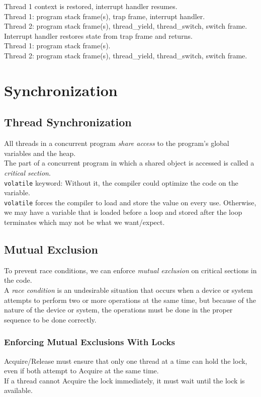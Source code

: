 \documentclass[12pt]{article}
\theoremstyle{plain}
\theoremstyle{definition}
\begin{document}
Thread 1 context is restored, interrupt handler resumes. \\
Thread 1: program stack frame(s), trap frame, interrupt handler. \\
Thread 2: program stack frame(s), thread\_yield, thread\_switch, switch frame. \\

Interrupt handler restores state from trap frame and returns. \\
Thread 1: program stack frame(s). \\
Thread 2: program stack frame(s), thread\_yield, thread\_switch, switch frame.


\section{Synchronization}
\subsection{Thread Synchronization}
All threads in a concurrent program \emph{share access} to the program's global variables and the heap. \\
The part of a concurrent program in which a shared object is accessed is called a \emph{critical section}. \\

\texttt{volatile} keyword:
Without it, the compiler could optimize the code on the variable. \\
\texttt{volatile} forces the compiler to load and store the value on every use.
Otherwise, we may have a variable that is loaded before a loop and stored after the loop terminates which may not be what we want/expect.

\subsection{Mutual Exclusion}
To prevent race conditions, we can enforce \emph{mutual exclusion} on critical sections in the code. \\

A \emph{race condition} is an undesirable situation that occurs when a device or system attempts to perform two or more operations at the same time, but because of the nature of the device or system, the operations must be done in the proper sequence to be done correctly.

\subsubsection{Enforcing Mutual Exclusions With Locks}
Acquire/Release must ensure that only one thread at a time can hold the lock, even if both attempt to Acquire at the same time. \\
If a thread cannot Acquire the lock immediately, it must wait until the lock is available.
\end{document}
